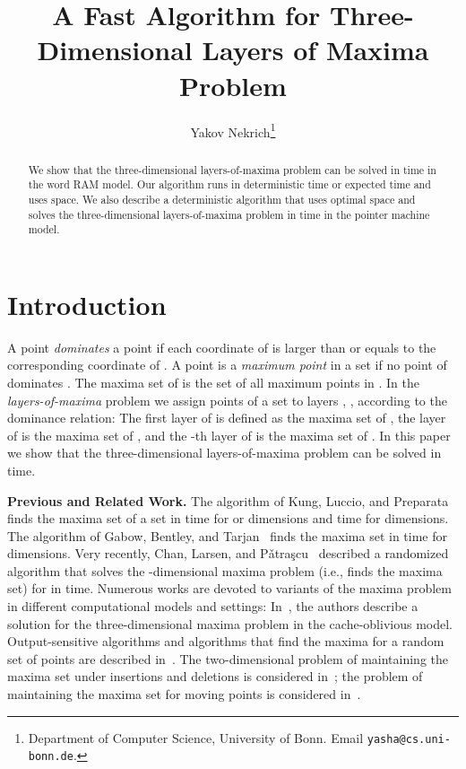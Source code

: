 \documentclass[10pt]{llncs}
\begin{document}
\title{ A Fast Algorithm for Three-Dimensional Layers of Maxima
 Problem}
\author{Yakov Nekrich\thanks{Department of Computer Science, University of Bonn. Email {\tt yasha@cs.uni-bonn.de}.}
}
\institute{}
\maketitle
\begin{abstract}
  We show that the three-dimensional layers-of-maxima problem can be solved 
in  time in the word RAM model. 
  Our  algorithm runs  in  deterministic time or 
 expected time and uses  space.
  We also describe a deterministic  algorithm that uses optimal  space and solves 
  the three-dimensional layers-of-maxima problem in  time 
  in the pointer machine model. 
\end{abstract} 
\thispagestyle{empty}

\section{Introduction}
A point  \emph{dominates} a point  if each coordinate of  
is larger than or equals to the corresponding coordinate of . 
A point  is a \emph{maximum point} in a set  if no point of  
dominates . The maxima set of  is the set of all maximum points 
in . 
In the {\em layers-of-maxima} problem we assign points of a set  
to layers , ,  according to the dominance relation: 
The first layer of  is defined as the maxima set of , the 
layer  of  is the maxima set of , 
and the -th layer of 
 is the maxima set of . 
In this paper we show that the three-dimensional layers-of-maxima 
problem can be solved in  time. 

{\bf Previous and Related Work.} 
The algorithm of Kung, Luccio, and Preparata~\cite{KLP75} finds the 
maxima set of a set  in 
 time for  or  dimensions and 
 time for  dimensions.
The  algorithm of Gabow, Bentley, and Tarjan~\cite{GBT84} finds the 
maxima set in   time 
for  dimensions. 
Very recently, Chan, Larsen, and P\v{a}tra\c{s}cu~\cite{CLP11} described a
randomized  algorithm that  solves  the -dimensional 
maxima problem (i.e., finds the maxima set) for  in 
 time.
Numerous works are devoted to variants of the 
maxima problem in 
different computational models and settings:
In~\cite{BF02}, the authors describe a solution for the three-dimensional 
maxima problem in the cache-oblivious model.
Output-sensitive algorithms and algorithms  that find the maxima 
for a random set of points are described in~\cite{BCL90,Cl94,G94,KS85}.
The two-dimensional problem of maintaining the maxima set under insertions
 and deletions 
is considered in~\cite{K94}; the problem of maintaining the maxima set 
for moving points is considered in~\cite{FGT92}.
\end{document}
